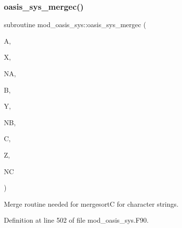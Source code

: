 \subsubsection{\texorpdfstring{oasis\+\_\+sys\+\_\+mergec()}{oasis\_sys\_mergec()}}
{\footnotesize\ttfamily subroutine mod\+\_\+oasis\+\_\+sys\+::oasis\+\_\+sys\+\_\+mergec (\begin{DoxyParamCaption}\item[{character(cl), dimension(na), intent(inout)}]{A,  }\item[{integer(in), dimension(na), intent(inout)}]{X,  }\item[{integer, intent(in)}]{NA,  }\item[{character(cl), dimension(nb), intent(in)}]{B,  }\item[{integer(in), dimension(nb), intent(in)}]{Y,  }\item[{integer, intent(in)}]{NB,  }\item[{character(cl), dimension(nc), intent(inout)}]{C,  }\item[{integer(in), dimension(nc), intent(inout)}]{Z,  }\item[{integer, intent(in)}]{NC }\end{DoxyParamCaption})\hspace{0.3cm}{\ttfamily [private]}}



Merge routine needed for mergesortC for character strings. 



Definition at line 502 of file mod\+\_\+oasis\+\_\+sys.\+F90.

\mbox{\label{namespacemod__oasis__sys_a5384f02abfdf4a5cee0706ddefecde87}} 
